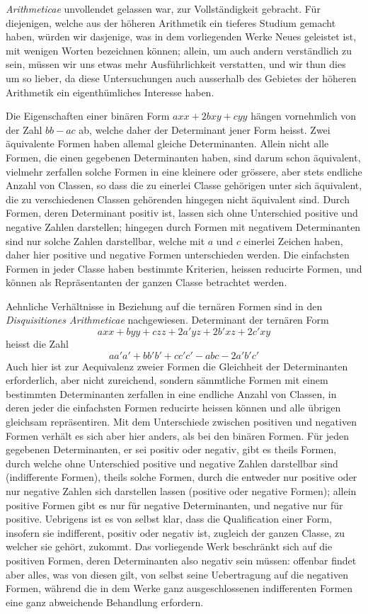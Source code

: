 %
\emph{Arithmeticae} unvollendet gelassen war, zur Vollständigkeit gebracht. Für diejenigen, welche aus der höheren Arithmetik ein tieferes Studium gemacht haben, würden wir dasjenige, was in dem vorliegenden Werke Neues geleistet ist, mit wenigen Worten bezeichnen können; allein, um auch andern verständlich zu sein, müssen wir uns etwas mehr Ausführlichkeit verstatten, und wir thun dies um so lieber, da diese Untersuchungen auch ausserhalb des Gebietes der höheren Arithmetik ein eigenthümliches Interesse haben.

Die Eigenschaften einer binären Form $axx+2bxy+cyy$ hängen vornehmlich von der Zahl $bb-ac$ ab, welche daher der Determinant jener Form heisst. Zwei äquivalente Formen haben allemal gleiche Determinanten. Allein nicht alle Formen, die einen gegebenen Determinanten haben, sind darum schon äquivalent, vielmehr zerfallen solche Formen in eine kleinere oder grössere, aber stets endliche Anzahl von Classen, so dass die zu einerlei Classe gehörigen unter sich äquivalent, die zu verschiedenen Classen gehörenden hingegen nicht äquivalent sind. Durch Formen, deren Determinant positiv ist, lassen sich ohne Unterschied positive und negative Zahlen darstellen; hingegen durch Formen mit negativem Determinanten sind nur solche Zahlen darstellbar, welche mit $a$ und $c$ einerlei Zeichen haben, daher hier positive und negative Formen unterschieden werden. Die einfachsten Formen in jeder Classe haben bestimmte Kriterien, heissen reducirte Formen, und können als Repräsentanten der ganzen Classe betrachtet werden.

Aehnliche Verhältnisse in Beziehung auf die ternären Formen sind in den \emph{Disquisitiones Arithmeticae} nachgewiesen. Determinant der ternären Form
\[
axx+byy+czz+2a'yz+2b'xz+2c'xy
\]
heisst die Zahl
\[
aa'a'+bb'b'+cc'c'-abc-2a'b'c'
\]
Auch hier ist zur Aequivalenz zweier Formen die Gleichheit der Determinanten erforderlich, aber nicht zureichend, sondern sämmtliche Formen mit einem bestimmten Determinanten zerfallen in eine endliche Anzahl von Classen, in deren jeder die einfachsten Formen reducirte heissen können und alle übrigen gleichsam repräsentiren. Mit dem Unterschiede zwischen positiven und negativen Formen verhält es sich aber hier anders, als bei den binären Formen. Für jeden gegebenen Determinanten, er sei positiv oder negativ, gibt es theils Formen, durch welche
%
ohne Unterschied positive und negative Zahlen darstellbar sind (indifferente Formen), theils solche Formen, durch die entweder nur positive oder nur negative Zahlen sich darstellen lassen (positive oder negative Formen); allein positive Formen gibt es nur für negative Determinanten, und negative nur für positive. Uebrigens ist es von selbst klar, dass die Qualification einer Form, insofern sie indifferent, positiv oder negativ ist, zugleich der ganzen Classe, zu welcher sie gehört, zukommt. Das vorliegende Werk beschränkt sich auf die positiven Formen, deren Determinanten also negativ sein müssen: offenbar findet aber alles, was von diesen gilt, von selbst seine Uebertragung auf die negativen Formen, während die in dem Werke ganz ausgeschlossenen indifferenten Formen eine ganz abweichende Behandlung erfordern.

